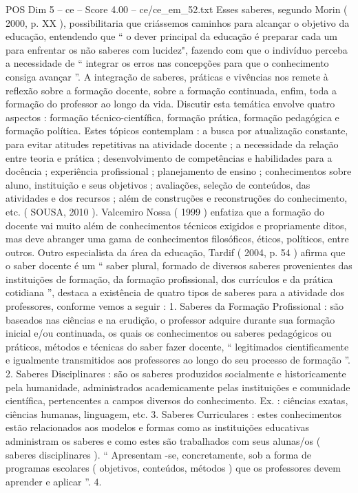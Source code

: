 \begin{textsample}{POS Dim 5 – ce – Score 4.00 – ce/ce\_em\_52.txt}
Esses saberes, segundo Morin ( 2000, p.
XX ), possibilitaria que criássemos caminhos para alcançar o objetivo da educação, entendendo que “ o dever principal da educação é preparar cada um para enfrentar os não saberes com lucidez", fazendo com que o indivíduo perceba a necessidade de “ integrar os erros nas concepções para que o conhecimento consiga avançar ”.
A integração de saberes, práticas e vivências nos remete à reflexão sobre a formação docente, sobre a formação continuada, enfim, toda a formação do professor ao longo da vida.
Discutir esta temática envolve quatro aspectos : formação técnico-científica, formação prática, formação pedagógica e formação política.
Estes tópicos contemplam : a busca por atualização constante, para evitar atitudes repetitivas na atividade docente ; a necessidade da relação entre teoria e prática ; desenvolvimento de competências e habilidades para a docência ; experiência profissional ; planejamento de ensino ; conhecimentos sobre aluno, instituição e seus objetivos ; avaliações, seleção de conteúdos, das atividades e dos recursos ; além de construções e reconstruções do conhecimento, etc. ( SOUSA, 2010 ).
Valcemiro Nossa ( 1999 ) enfatiza que a formação do docente vai muito além de conhecimentos técnicos exigidos e propriamente ditos, mas deve abranger uma gama de conhecimentos filosóficos, éticos, políticos, entre outros.
Outro especialista da área da educação, Tardif ( 2004, p. 54 ) afirma que o saber docente é um “ saber plural, formado de diversos saberes provenientes das instituições de formação, da formação profissional, dos currículos e da prática cotidiana ”, destaca a existência de quatro tipos de saberes para a atividade dos professores, conforme vemos a seguir : 1.
Saberes da Formação Profissional : são baseados nas ciências e na erudição, o professor adquire durante sua formação inicial e/ou continuada, os quais os conhecimentos ou saberes pedagógicos ou práticos, métodos e técnicas do saber fazer docente, “ legitimados cientificamente e igualmente transmitidos aos professores ao longo do seu processo de formação ”. 2.
Saberes Disciplinares : são os saberes produzidos socialmente e historicamente pela humanidade, administrados academicamente pelas instituições e comunidade científica, pertencentes a campos diversos do conhecimento.
Ex. : ciências exatas, ciências humanas, linguagem, etc. 3.
Saberes Curriculares : estes conhecimentos estão relacionados aos modelos e formas como as instituições educativas administram os saberes e como estes são trabalhados com seus alunas/os ( saberes disciplinares ). “ Apresentam -se, concretamente, sob a forma de programas escolares ( objetivos, conteúdos, métodos ) que os professores devem aprender e aplicar ”. 4.

\end{textsample}
